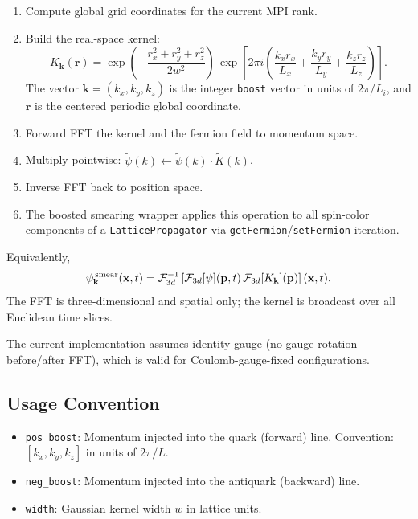\documentclass[11pt]{article}
\begin{document}
\begin{enumerate}
    \item Compute global grid coordinates for the current MPI rank.
    \item Build the real-space kernel:
    \begin{equation}
        K_{\mathbf{k}}(\mathbf{r})
        =
        \exp\left(-\frac{r_x^2 + r_y^2 + r_z^2}{2w^2}\right) \,
        \exp\left[
          2\pi i
          \left(
            \frac{k_x r_x}{L_x}
            + \frac{k_y r_y}{L_y}
            + \frac{k_z r_z}{L_z}
          \right)
        \right].
    \end{equation}
    The vector \(\mathbf{k}=(k_x,k_y,k_z)\) is the integer \texttt{boost}
    vector in units of \(2\pi/L_i\), and \(\mathbf{r}\) is the centered
    periodic global coordinate.
    \item Forward FFT the kernel and the fermion field to momentum space.
    \item Multiply pointwise: $\tilde{\psi}(k) \leftarrow \tilde{\psi}(k) \cdot \tilde{K}(k)$.
    \item Inverse FFT back to position space.
    \item The boosted smearing wrapper applies this operation to all spin-color components of a \texttt{LatticePropagator} via \texttt{getFermion}/\texttt{setFermion} iteration.
\end{enumerate}

Equivalently,
\begin{equation}
  \psi^{\,{\rm smear}}_{\mathbf{k}}(\mathbf{x},t)
  =
  \mathcal{F}^{-1}_{3d}
  \left[
    \mathcal{F}_{3d}[\psi](\mathbf{p},t)\,
    \mathcal{F}_{3d}[K_{\mathbf{k}}](\mathbf{p})
  \right](\mathbf{x},t).
\end{equation}
The FFT is three-dimensional and spatial only; the kernel is broadcast over all
Euclidean time slices.

The current implementation assumes identity gauge (no gauge rotation before/after FFT), which is valid for Coulomb-gauge-fixed configurations.

\subsection{Usage Convention}

\begin{itemize}
    \item \texttt{pos\_boost}: Momentum injected into the quark (forward) line. Convention: $[k_x, k_y, k_z]$ in units of $2\pi/L$.
    \item \texttt{neg\_boost}: Momentum injected into the antiquark (backward) line.
    \item \texttt{width}: Gaussian kernel width $w$ in lattice units.
\end{itemize}
\end{document}
